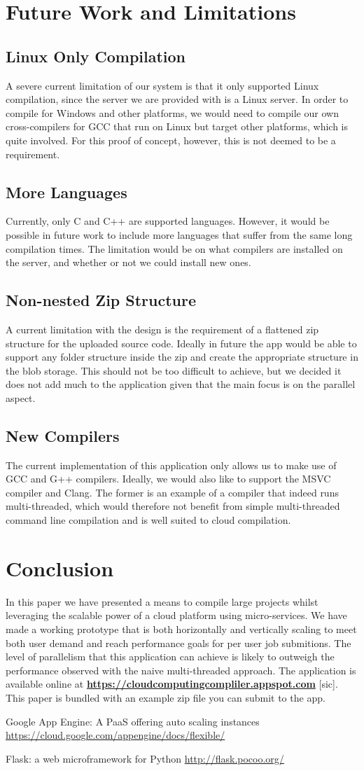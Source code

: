 \documentclass[conference]{IEEEtran}
\begin{document}
\section{Future Work and Limitations}
\subsection{Linux Only Compilation}
A severe current limitation of our system is that it only supported Linux
compilation, since the server we are provided with is a Linux server. In order
to compile for Windows and other platforms, we would need to compile our own
cross-compilers for GCC that run on Linux but target other platforms, which is
quite involved. For this proof of concept, however, this is not deemed to be a
requirement.
\subsection{More Languages}
Currently, only C and C++ are supported languages. However, it would be possible
in future work to include more languages that suffer from the same long
compilation times. The limitation would be on what compilers are installed on
the server, and whether or not we could install new ones.
\subsection{Non-nested Zip Structure}
A current limitation with the design is the requirement of a flattened zip
structure for the uploaded source code. Ideally in future the app would be able
to support any folder structure inside the zip and create the appropriate
structure in the blob storage. This should not be too difficult to achieve, but
we decided it does not add much to the application given that the main focus is
on the parallel aspect.
\subsection{New Compilers}
The current implementation of this application only allows us to make use of GCC
and G++ compilers. Ideally, we would also like to support the MSVC compiler and
Clang. The former is an example of a compiler that indeed runs multi-threaded,
which would therefore not benefit from simple multi-threaded command line compilation
and is well suited to cloud compilation.
\section{Conclusion}
In this paper we have presented a means to compile large projects whilst
leveraging the scalable power of a cloud platform using micro-services. We have
made a working prototype that is both horizontally and vertically scaling to
meet both user demand and reach performance goals for per user job submitions.
The level of parallelism that this application can achieve is likely to outweigh
the performance observed with the naive multi-threaded approach. The application
is available online at
\textbf{\url{https://cloudcomputingcompliler.appspot.com}} [sic].
This paper is bundled with an example zip file you can submit to the app.

\begin{thebibliography}{00}
    Google App Engine: A PaaS offering auto scaling instances
    \url{https://cloud.google.com/appengine/docs/flexible/}

    Flask: a web microframework for Python
    \url{http://flask.pocoo.org/}
\end{thebibliography}
\end{document}
